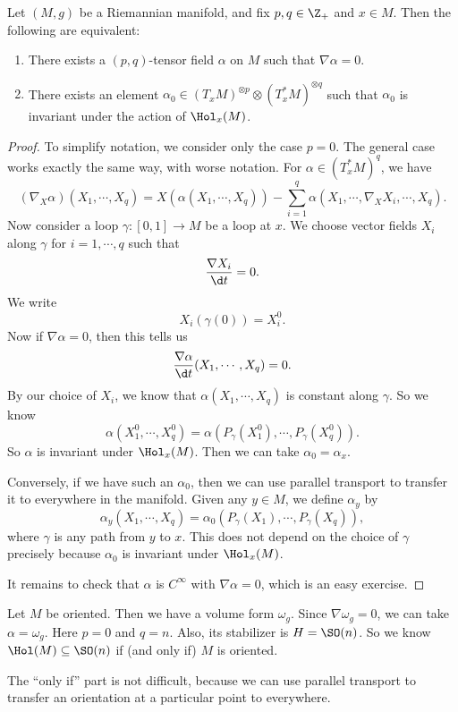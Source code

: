 \documentclass[a4paper]{article}
\begin{document}
\begin{prop}
  Let $(M, g)$ be a Riemannian manifold, and fix $p, q \in \Z_+$ and $x \in M$. Then the following are equivalent:
  \begin{enumerate}
    \item There exists a $(p, q)$-tensor field $\alpha$ on $M$ such that $\nabla \alpha = 0$.
    \item There exists an element $\alpha_0 \in (T_x M)^{\otimes p} \otimes (T_x^* M)^{\otimes q}$ such that $\alpha_0$ is invariant under the action of $\Hol_x(M)$.
  \end{enumerate}
\end{prop}

\begin{proof}
  To simplify notation, we consider only the case $p = 0$. The general case works exactly the same way, with worse notation. For $\alpha \in (T_x^* M)^q$, we have
  \[
    (\nabla_X \alpha)(X_1, \cdots, X_q) = X(\alpha(X_1, \cdots, X_q)) - \sum_{i = 1}^q \alpha(X_1, \cdots, \nabla_X X_i, \cdots, X_q).
  \]
  Now consider a loop $\gamma: [0, 1] \to M$ be a loop at $x$. We choose vector fields $X_i$ along $\gamma$ for $i = 1, \cdots, q$ such that
  \[
    \frac{\nabla X_i}{\d t} = 0.
  \]
  We write
  \[
    X_i(\gamma(0)) = X_i^0.
  \]
  Now if $\nabla \alpha = 0$, then this tells us
  \[
    \frac{\nabla \alpha}{\d t}(X_1, \cdots, X_q) = 0.
  \]
  By our choice of $X_i$, we know that $\alpha(X_1, \cdots, X_q)$ is constant along $\gamma$. So we know
  \[
    \alpha(X_1^0, \cdots,X_q^0) = \alpha(P_\gamma(X_1^0), \cdots, P_\gamma(X_q^0)).
  \]
  So $\alpha$ is invariant under $\Hol_x(M)$. Then we can take $\alpha_0 = \alpha_x$.

  Conversely, if we have such an $\alpha_0$, then we can use parallel transport to transfer it to everywhere in the manifold. Given any $y \in M$, we define $\alpha_y$ by
  \[
    \alpha_y(X_1, \cdots, X_q) = \alpha_0(P_\gamma(X_1), \cdots, P_\gamma(X_q)),
  \]
  where $\gamma$ is any path from $y$ to $x$. This does not depend on the choice of $\gamma$ precisely because $\alpha_0$ is invariant under $\Hol_x(M)$.

  It remains to check that $\alpha$ is $C^\infty$ with $\nabla \alpha = 0$, which is an easy exercise.
\end{proof}

\begin{eg}
  Let $M$ be oriented. Then we have a volume form $\omega_g$. Since $\nabla \omega_g = 0$, we can take $\alpha = \omega_g$. Here $p = 0$ and $q = n$. Also, its stabilizer is $H = \SO(n)$. So we know $\Hol(M) \subseteq \SO(n)$ if (and only if) $M$ is oriented.

  The ``only if'' part is not difficult, because we can use parallel transport to transfer an orientation at a particular point to everywhere.
\end{eg}
\end{document}
